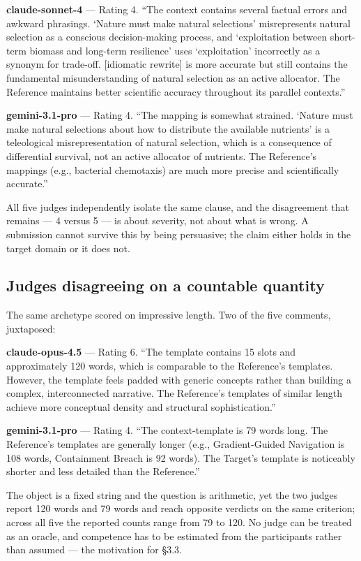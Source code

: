 \documentclass{article}
\begin{document}
\textbf{claude-sonnet-4} --- Rating 4. ``The context contains several factual errors and awkward phrasings. `Nature must make natural selections' misrepresents natural selection as a conscious decision-making process, and `exploitation between short-term biomass and long-term resilience' uses `exploitation' incorrectly as a synonym for trade-off. {[}idiomatic rewrite{]} is more accurate but still contains the fundamental misunderstanding of natural selection as an active allocator. The Reference maintains better scientific accuracy throughout its parallel contexts.''

\textbf{gemini-3.1-pro} --- Rating 4. ``The mapping is somewhat strained. `Nature must make natural selections about how to distribute the available nutrients' is a teleological misrepresentation of natural selection, which is a consequence of differential survival, not an active allocator of nutrients. The Reference's mappings (e.g., bacterial chemotaxis) are much more precise and scientifically accurate.''

All five judges independently isolate the same clause, and the disagreement that remains --- 4 versus 5 --- is about severity, not about what is wrong. A submission cannot survive this by being persuasive; the claim either holds in the target domain or it does not.

\subsection{Judges disagreeing on a countable quantity}\label{judges-disagreeing-on-a-countable-quantity}

The same archetype scored on impressive length. Two of the five comments, juxtaposed:

\textbf{claude-opus-4.5} --- Rating 6. ``The template contains 15 slots and approximately 120 words, which is comparable to the Reference's templates. However, the template feels padded with generic concepts rather than building a complex, interconnected narrative. The Reference's templates of similar length achieve more conceptual density and structural sophistication.''

\textbf{gemini-3.1-pro} --- Rating 4. ``The context-template is 79 words long. The Reference's templates are generally longer (e.g., Gradient-Guided Navigation is 108 words, Containment Breach is 92 words). The Target's template is noticeably shorter and less detailed than the Reference.''

The object is a fixed string and the question is arithmetic, yet the two judges report 120 words and 79 words and reach opposite verdicts on the same criterion; across all five the reported counts range from 79 to 120. No judge can be treated as an oracle, and competence has to be estimated from the participants rather than assumed --- the motivation for \S{}3.3.
\end{document}
